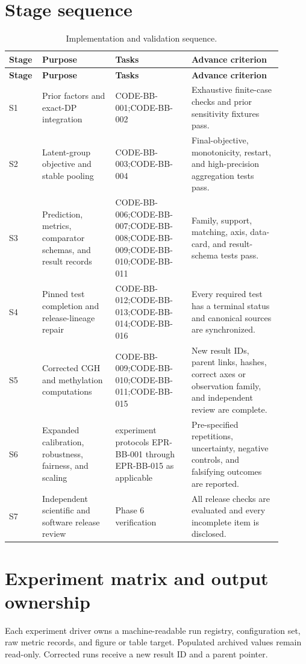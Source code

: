 \section{Stage sequence}
\small
\begin{longtable}{@{}p{0.08\linewidth}p{0.25\linewidth}p{0.26\linewidth}p{0.31\linewidth}@{}}
\caption{Implementation and validation sequence.}\label{tab:handoff-stages}\\
\toprule
\textbf{Stage} & \textbf{Purpose} & \textbf{Tasks} & \textbf{Advance criterion}\\
\midrule
\endfirsthead
\toprule
\textbf{Stage} & \textbf{Purpose} & \textbf{Tasks} & \textbf{Advance criterion}\\
\midrule
\endhead
S1 & Prior factors and exact-DP integration & CODE-BB-001;CODE-BB-002 & Exhaustive finite-case checks and prior sensitivity fixtures pass. \\
S2 & Latent-group objective and stable pooling & CODE-BB-003;CODE-BB-004 & Final-objective, monotonicity, restart, and high-precision aggregation tests pass. \\
S3 & Prediction, metrics, comparator schemas, and result records & CODE-BB-006;CODE-BB-007;CODE-BB-008;CODE-BB-009;CODE-BB-010;CODE-BB-011 & Family, support, matching, axis, data-card, and result-schema tests pass. \\
S4 & Pinned test completion and release-lineage repair & CODE-BB-012;CODE-BB-013;CODE-BB-014;CODE-BB-016 & Every required test has a terminal status and canonical sources are synchronized. \\
S5 & Corrected CGH and methylation computations & CODE-BB-009;CODE-BB-010;CODE-BB-011;CODE-BB-015 & New result IDs, parent links, hashes, correct axes or observation family, and independent review are complete. \\
S6 & Expanded calibration, robustness, fairness, and scaling & experiment protocols EPR-BB-001 through EPR-BB-015 as applicable & Pre-specified repetitions, uncertainty, negative controls, and falsifying outcomes are reported. \\
S7 & Independent scientific and software release review & Phase 6 verification & All release checks are evaluated and every incomplete item is disclosed. \\
\bottomrule
\end{longtable}
\normalsize

\section{Experiment matrix and output ownership}
Each experiment driver owns a machine-readable run registry, configuration set, raw metric records, and figure or table target. Populated archived values remain read-only. Corrected runs receive a new result ID and a parent pointer.

